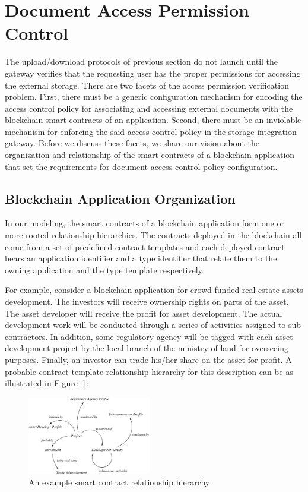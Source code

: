 \documentclass[conference]{IEEEtran}
\begin{document}




\section{Document Access Permission Control}
\label{s-accr}
The upload/download protocols of previous section do not launch until the gateway verifies that the requesting user has the proper permissions for accessing the external storage. There are two facets of the access permission verification problem. First, there must be a generic configuration mechanism for encoding the access control policy for associating and accessing external documents with the blockchain smart contracts of an application. Second, there must be an inviolable mechanism for enforcing the said access control policy in the storage integration gateway. Before we discuss these facets, we share our vision about the organization and relationship of the smart contracts of a blockchain application that set the requirements for document access control policy configuration.

\subsection{Blockchain Application Organization}
In our modeling, the smart contracts of a blockchain application form one or more rooted relationship hierarchies. The contracts deployed in the blockchain all come from a set of predefined contract templates and each deployed contract bears an application identifier and a type identifier that relate them to the owning application and the type template respectively.

For example, consider a blockchain application for crowd-funded real-estate assets development. The investors will receive ownership rights on parts of the asset. The asset developer will receive the profit for asset development. The actual development work will be conducted through a series of activities assigned to sub-contractors. In addition, some regulatory agency will be tagged with each asset development project by the local branch of the ministry of land for overseeing purposes. Finally, an investor can trade his/her share on the asset for profit. A probable contract template relationship hierarchy for this description can be as illustrated in Figure~\ref{fig-2}:
\begin{figure}[h]
\label{fig-2}
\centering
\includegraphics[width=0.48\textwidth]{access-req-example}                    
\caption{An example smart contract relationship hierarchy}
\end{figure}
\end{document}
